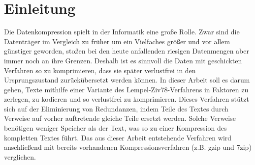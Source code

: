 \documentclass[a4paper,11pt]{scrartcl}%
\theoremstyle{change}
\theoremstyle{nonumberplain}
\theoremstyle{change}
\theoremstyle{nonumberplain}
\theoremstyle{change}
\theoremstyle{nonumberplain}
\begin{document}

\thispagestyle{empty}
\newpage
\tableofcontents
\newpage
\newpage

\section{Einleitung}
Die Datenkompression spielt in der Informatik eine große Rolle. Zwar sind die Datenträger im Vergleich zu früher um ein Vielfaches größer und vor allem günstiger geworden, stoßen bei den heute anfallenden riesigen Datenmengen aber immer noch an ihre Grenzen. Deshalb ist es sinnvoll die Daten mit geschickten Verfahren so zu komprimieren, dass sie später verlustfrei in den Ursprungszustand zurückübersetzt werden können.
In dieser Arbeit soll es darum gehen, Texte mithilfe einer Variante des Lempel-Ziv78-Verfahrens in Faktoren zu zerlegen, zu kodieren und so verlustfrei zu komprimieren. Dieses Verfahren stützt sich auf der Eliminierung von Redundanzen, indem Teile des Textes durch Verweise auf vorher auftretende gleiche Teile ersetzt werden. Solche Verweise benötigen weniger Speicher als der Text, was so zu einer Kompression des kompletten Textes führt.
Das aus dieser Arbeit entstehende Verfahren wird anschließend mit bereits vorhandenen Kompressionsverfahren (z.B. gzip und 7zip) verglichen.\\\\
\end{document}
